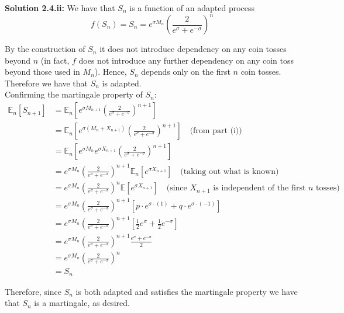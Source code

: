 \documentclass[12pt]{article}
\newlength\tindent
\renewcommand{\indent}{\hspace*{\tindent}}
\newcommand{\E}{\mathbb E}
\begin{document}
{\bf Solution 2.4.ii:} We have that $S_n$ is a function of an adapted process 
\begin{equation*}
	f(S_n) = S_n = e^{\sigma M_n} \left( \frac{2}{e^{\sigma} + e^{-\sigma}} \right) ^n
\end{equation*}

\indent By the construction of $S_n$ it does not introduce dependency on any coin tosses beyond $n$ (in fact, $f$ does not introduce any further dependency on any coin toss beyond those used in $M_n$). Hence, $S_n$ depends only on the first $n$ coin tosses. Therefore we have that $S_n$ is adapted. \\

Confirming the martingale property of $S_n$:
\begin{align*}
	\E_n \left[ S_{n + 1} \right] &= \E_n \left[ e^{\sigma M_{n + 1}} \left( \frac{2}{e^{\sigma} + e^{-\sigma}} \right)^{n + 1} \right] \\
	&= \E_n \left[ e^{\sigma (M_n + X_{n + 1})} \left( \frac{2}{e^{\sigma} + e^{-\sigma}} \right)^{n + 1} \right] \quad \text{(from part (i))} \\
	&= \E_n \left[ e^{\sigma M_n} e^{\sigma X_{n + 1}} \left( \frac{2}{e^{\sigma} + e^{-\sigma}} \right)^{n + 1} \right] \\
	&= e^{\sigma M_n}\left( \frac{2}{e^{\sigma} + e^{-\sigma}} \right)^{n + 1} \E_n \left[ e^{\sigma X_{n + 1}} \right]  \quad \text{(taking out what is known)} \\
	&= e^{\sigma M_n}\left( \frac{2}{e^{\sigma} + e^{-\sigma}} \right)^n \E \left[ e^{\sigma X_{n + 1}} \right]  \quad \text{(since $X_{n + 1}$ is independent of the first $n$ tosses)} \\
	&= e^{\sigma M_n}\left( \frac{2}{e^{\sigma} + e^{-\sigma}} \right)^{n + 1} \left[ p\cdot e^{\sigma\cdot(1)} + q\cdot e^{\sigma\cdot(-1)} \right] \\
	&= e^{\sigma M_n}\left( \frac{2}{e^{\sigma} + e^{-\sigma}} \right)^{n + 1} \left[ \frac{1}{2}e^{\sigma} + \frac{1}{2} e^{-\sigma} \right] \\
	&= e^{\sigma M_n}\left( \frac{2}{e^{\sigma} + e^{-\sigma}} \right)^{n + 1} \frac{ e^{\sigma} + e^{-\sigma} }{2} \\
	&= e^{\sigma M_n}\left( \frac{2}{e^{\sigma} + e^{-\sigma}} \right)^n \\
	&= S_n
\end{align*}

\indent Therefore, since $S_n$ is both adapted and satisfies the martingale property we have that $S_n$ is a martingale, as desired. \\
\end{document}
